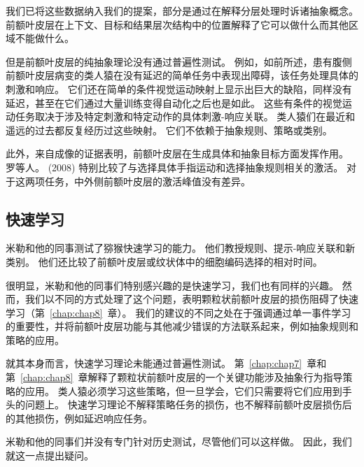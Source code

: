 我们已将这些数据纳入我们的提案，部分是通过在解释分层处理时诉诸抽象概念。
前额叶皮层在上下文、目标和结果层次结构中的位置解释了它可以做什么而其他区域不能做什么。
\par


但是前额叶皮层的纯抽象理论没有通过普遍性测试。
例如，如前所述，患有腹侧前额叶皮层病变的类人猿在没有延迟的简单任务中表现出障碍\cite{iversen1970perseverative}，该任务处理具体的刺激和响应。
它们还在简单的条件视觉运动映射上显示出巨大的缺陷，同样没有延迟，甚至在它们通过大量训练变得自动化之后也是如此\cite{bussey2001role}。
这些有条件的视觉运动任务取决于涉及特定刺激和特定动作的具体刺激-响应关联。
类人猿们在最近和遥远的过去都反复经历过这些映射。 它们不依赖于抽象规则、策略或类别。
\par


此外，来自成像的证据表明，前额叶皮层在生成具体和抽象目标方面发挥作用。 
罗等人。 (2008) 特别比较了与选择具体手指运动和选择抽象规则相关的激活。 对于这两项任务，中外侧前额叶皮层的激活峰值没有差异。



\subsection{快速学习}

米勒和他的同事测试了猕猴快速学习的能力。
他们教授规则\cite{miller2007rules}、提示-响应关联\cite{cromer2011rapid}和新类别\cite{antzoulatos2011differences}。
他们还比较了前额叶皮层或纹状体中的细胞编码选择的相对时间\cite{miller2007rules,antzoulatos2011differences}。
\par


很明显，米勒和他的同事们特别感兴趣的是快速学习，我们也有同样的兴趣。
然而，我们以不同的方式处理了这个问题，表明颗粒状前额叶皮层的损伤阻碍了快速学习（第~\ref{chap:chap8}~章）。
我们的建议的不同之处在于强调通过单一事件学习的重要性，并将前额叶皮层功能与其他减少错误的方法联系起来，例如抽象规则和策略的应用。
\par


就其本身而言，快速学习理论未能通过普遍性测试。
第~\ref{chap:chap7}~章和第~\ref{chap:chap8}~章解释了颗粒状前额叶皮层的一个关键功能涉及抽象行为指导策略的应用。
类人猿必须学习这些策略，但一旦学会，它们只需要将它们应用到手头的问题上。
快速学习理论不解释策略任务的损伤，也不解释前额叶皮层损伤后的其他损伤，例如延迟响应任务。
\par


米勒和他的同事们并没有专门针对历史测试，尽管他们可以这样做。
因此，我们就这一点提出疑问。




